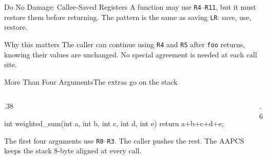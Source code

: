 \documentclass[9pt,aspectratio=169,xcolor=table]{beamer}
\begin{document}
\begin{frame}[fragile]{Do No Damage: Callee-Saved Registers}
	\leavevmode
	{\small
    			A function may use \texttt{R4}--\texttt{R11}, but it must restore
    			them before returning. The pattern is the same as saving
    			\texttt{LR}: \alert{save, use, restore}.}

    \vspace{2mm}

    \vspace{2mm}
\begin{block}{Why this matters} The caller can continue using \texttt{R4} and \texttt{R5} after \texttt{foo} returns, knowing their values are unchanged. No special agreement is needed at each call site. \end{block}
\end{frame}

\begin{frame}[fragile]{More Than Four Arguments}{The extras go on the stack}
    \begin{columns}[T]
    \begin{column}{.38\textwidth}
\begin{cc}[basicstyle=\ttfamily\footnotesize]
int weighted_sum(int a, int b,
                 int c, int d,
                 int e) {
    return a+b+c+d+e;
}
\end{cc}
        \vspace{1mm}
        {\small The first four arguments use \texttt{R0}--\texttt{R3}. The caller pushes the rest. The AAPCS keeps the stack \alert{8-byte aligned} at every call.}
    \end{column}
    \begin{column}{.6\textwidth}
    \end{column}
    \end{columns}
\end{frame}
\end{document}
